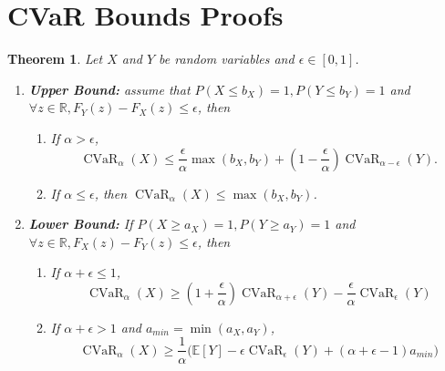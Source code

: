 \documentclass[acmlarge, manuscript, screen, review, natbib=false, oneside]{acmart}
\newtheorem{theorem}{Theorem}[section]
\DeclareMathOperator{\CVaR}{CVaR}
\begin{document}
\section{CVaR Bounds Proofs}
\begin{theorem}\label{prf:cvar_bound_v2}
	Let $X$ and $Y$ be random variables and $\epsilon \in [0, 1]$. 
	\begin{enumerate}
		\item \textbf{Upper Bound:} assume that $P(X\leq b_X)=1, P(Y\leq b_Y)=1$ and $\forall z\in \mathbb{R},F_Y(z)-F_X(z)\leq \epsilon$, then 
		\begin{enumerate}
			\item If $\alpha > \epsilon$, \begin{equation}
				\CVaR_\alpha(X) \leq \frac{\epsilon}{\alpha}\max(b_X,b_Y) + (1 - \frac{\epsilon}{\alpha})\CVaR_{\alpha-\epsilon}(Y).
			\end{equation}
			
			\item If $\alpha \leq \epsilon$, then $\CVaR_\alpha(X)\leq \max(b_X,b_Y)$.
		\end{enumerate}
		
		\item \textbf{Lower Bound:} If $P(X\geq a_X)=1, P(Y\geq a_Y)=1$ and $\forall z\in \mathbb{R},F_X(z)-F_Y(z)\leq \epsilon$, then
		\begin{enumerate}
			\item If $\alpha+\epsilon \leq 1$, \begin{equation}
				\CVaR_{\alpha}(X)\geq (1+\frac{\epsilon}{\alpha})\CVaR_{\alpha+\epsilon}(Y)-\frac{\epsilon}{\alpha} \CVaR_{\epsilon}(Y)
			\end{equation}
			
			\item If $\alpha+\epsilon > 1$ and $a_{min} = \min(a_X, a_Y)$, \begin{equation}
				\CVaR_\alpha(X) \geq \frac{1}{\alpha}\big(\mathbb{E}[Y] - \epsilon \CVaR_\epsilon(Y) + (\alpha+\epsilon-1)a_{min}\big)
			\end{equation}
		\end{enumerate}
	\end{enumerate}
\end{theorem}
\end{document}
